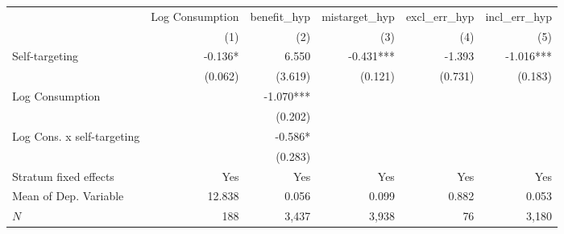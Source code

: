 \begin{tabular}{lrrrrr}
\toprule
                           & \multicolumn{1}{c}{Log Consumption} & \multicolumn{1}{c}{benefit_hyp} & \multicolumn{1}{c}{mistarget_hyp} & \multicolumn{1}{c}{excl_err_hyp} & \multicolumn{1}{c}{incl_err_hyp} \\ 
\cmidrule(lr){2-2} \cmidrule(lr){3-3} \cmidrule(lr){4-4} \cmidrule(lr){5-5} \cmidrule(lr){6-6} 
                           &                                 (1) &                             (2) &                               (3) &                              (4) &                              (5) \\ 
\midrule
Self-targeting             &                             -0.136* &                           6.550 &                         -0.431*** &                           -1.393 &                        -1.016*** \\ 
                           &                             (0.062) &                         (3.619) &                           (0.121) &                          (0.731) &                          (0.183) \\ 
Log Consumption            &                                     &                       -1.070*** &                                   &                                  &                                  \\ 
                           &                                     &                         (0.202) &                                   &                                  &                                  \\ 
Log Cons. x self-targeting &                                     &                         -0.586* &                                   &                                  &                                  \\ 
                           &                                     &                         (0.283) &                                   &                                  &                                  \\ 
\midrule
Stratum fixed effects      &                                 Yes &                             Yes &                               Yes &                              Yes &                              Yes \\ 
Mean of Dep. Variable      &                              12.838 &                           0.056 &                             0.099 &                            0.882 &                            0.053 \\ 
$N$                        &                                 188 &                           3,437 &                             3,938 &                               76 &                            3,180 \\ 
\bottomrule
\end{tabular}
